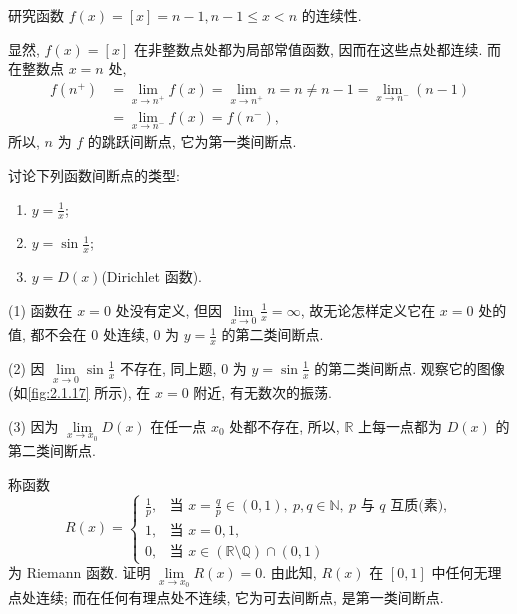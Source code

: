 \begin{example}\label{ex:2.4.4}
研究函数 $f(x) = [x] = n - 1, n - 1 \leqslant x < n$ 的连续性.
\end{example}

\begin{solution}
显然, $f(x) = [x]$ 在非整数点处都为局部常值函数, 因而在这些点处都连续. 而在整数点 $x = n$ 处,
\begin{align*}
f(n^+) &= \lim_{x \to n^+} f(x) = \lim_{x \to n^+} n = n \neq n - 1 = \lim_{x \to n^-} (n - 1) \\
&= \lim_{x \to n^-} f(x) = f(n^-),
\end{align*}
所以, $n$ 为 $f$ 的跳跃间断点, 它为第一类间断点.
\end{solution}

\begin{example}\label{ex:2.4.5}
讨论下列函数间断点的类型:
\begin{enumerate}[label=(\arabic*)]
  \item $y = \frac{1}{x}$;
  \item $y = \sin\frac{1}{x}$;
  \item $y = D(x)$(Dirichlet 函数).
\end{enumerate}
\end{example}

\begin{solution}
(1) 函数在 $x = 0$ 处没有定义, 但因 $\lim\limits_{x \to 0} \frac{1}{x} = \infty$, 故无论怎样定义它在 $x = 0$ 处的值, 都不会在 $0$ 处连续, $0$ 为 $y = \frac{1}{x}$ 的第二类间断点.

(2) 因 $\lim\limits_{x \to 0} \sin\frac{1}{x}$ 不存在, 同上题, $0$ 为 $y = \sin\frac{1}{x}$ 的第二类间断点. 观察它的图像(如\ref{fig:2.1.17} 所示), 在 $x = 0$ 附近, 有无数次的振荡.

(3) 因为 $\lim\limits_{x \to x_0} D(x)$ 在任一点 $x_0$ 处都不存在, 所以, $\mathbb{R}$ 上每一点都为 $D(x)$ 的第二类间断点.
\end{solution}

\begin{example}\label{ex:2.4.6}
称函数
\[
R(x) = \begin{cases} \frac{1}{p}, & \text{当 } x = \frac{q}{p} \in (0, 1),\ p, q \in \mathbb{N},\ p \text{ 与 } q \text{ 互质(素)}, \\ 1, & \text{当 } x = 0, 1, \\ 0, & \text{当 } x \in (\mathbb{R} \setminus \mathbb{Q}) \cap (0, 1) \end{cases}
\]
为 Riemann 函数. 证明 $\lim\limits_{x \to x_0} R(x) = 0$. 由此知, $R(x)$ 在 $[0, 1]$ 中任何无理点处连续; 而在任何有理点处不连续, 它为可去间断点, 是第一类间断点.
\end{example}

